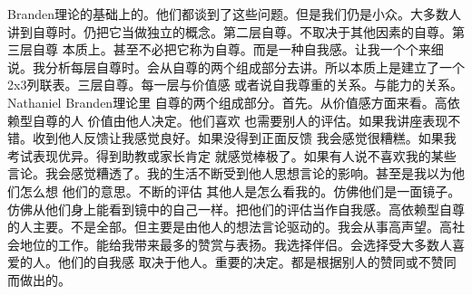 Branden理论的基础上的。他们都谈到了这些问题。但是我们仍是小众。大多数人讲到自尊时。仍把它当做独立的概念。第二层自尊。不取决于其他因素的自尊。第三层自尊 本质上。甚至不必把它称为自尊。而是一种自我感。让我一个个来细说。我分析每层自尊时。会从自尊的两个组成部分去讲。所以本质上是建立了一个2x3列联表。三层自尊。每一层与价值感 或者说自我尊重的关系。与能力的关系。Nathaniel Branden理论里 自尊的两个组成部分。首先。从价值感方面来看。高依赖型自尊的人 价值由他人决定。他们喜欢 也需要别人的评估。如果我讲座表现不错。收到他人反馈让我感觉良好。如果没得到正面反馈 我会感觉很糟糕。如果我考试表现优异。得到助教或家长肯定 就感觉棒极了。如果有人说不喜欢我的某些言论。我会感觉糟透了。我的生活不断受到他人思想言论的影响。甚至是我以为他们怎么想 他们的意思。不断的评估 其他人是怎么看我的。仿佛他们是一面镜子。仿佛从他们身上能看到镜中的自己一样。把他们的评估当作自我感。高依赖型自尊的人主要。不是全部。但主要是由他人的想法言论驱动的。我会从事高声望。高社会地位的工作。能给我带来最多的赞赏与表扬。我选择伴侣。会选择受大多数人喜爱的人。他们的自我感 取决于他人。重要的决定。都是根据别人的赞同或不赞同而做出的。 
%
